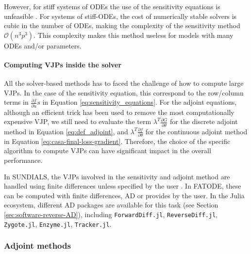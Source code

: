 However, for stiff systems of ODEs the use of the sensitivity equations is unfeasible \cite{kim_stiff_2021}.
For systems of stiff-ODEs, the cost of numerically stable solvers is cubic in the number of ODEs\cite{hairer-solving-2}, making the complexity of the sensitivity method $\mathcal{O}(n^3p^3)$. 
This complexity makes this method useless for models with many ODEs and/or parameters. 


\paragraph{Computing VJPs inside the solver}
\label{section:computing-vjp-inside-solver}

All the solver-based methods has to faced the challenge of how to compute large VJPs. 
In the case of the sensitivity equation, this correspond to the row/column terms in $\frac{\partial f}{\partial u} s $ in Equation \eqref{eq:sensitivity_equations}.
For the adjoint equations, although an efficient trick has been used to remove the most computationally expensive VJP, we still need to evaluate the term $\lambda^T \frac{\partial G}{\partial \theta}$ for the discrete adjoint method in Equation \eqref{eq:def_adjoint}, and $\lambda^T \frac{\partial f}{\partial \theta}$ for the continuous adjoint method in Equation \eqref{eq:casa-final-loss-gradient}. 
Therefore, the choice of the specific algorithm to compute VJPs can have significant impact in the overall performance. 

In SUNDIALS, the VJPs involved in the sensitivity and adjoint method are handled using finite differences unless specified by the user \cite{SUNDIALS-hindmarsh2005sundials}.
In FATODE, these can be computed with finite differences, AD or provides by the user.
In the Julia ecosystem, different AD packages are available for this task (see Section \ref{sec:software-reverse-AD}), including \texttt{ForwardDiff.jl}, \texttt{ReverseDiff.jl}, \texttt{Zygote.jl}\cite{Innes_Zygote}, \texttt{Enzyme.jl}\cite{moses_Enzyme}, \texttt{Tracker.jl}.

\subsubsection{Adjoint methods}
\label{section:computing-adjoints}


